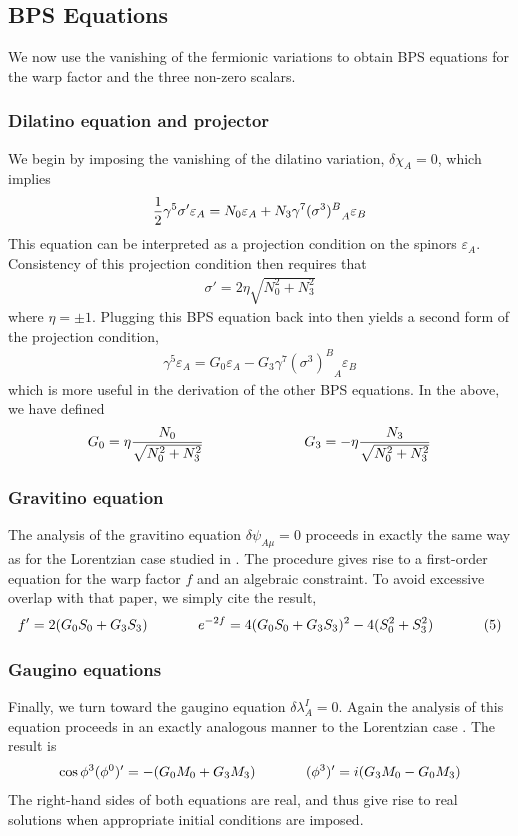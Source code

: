 \documentclass[12pt]{article}
\begin{document}
\subsection{BPS Equations}
We now use the vanishing of the fermionic variations to obtain BPS equations for the warp factor and the three non-zero scalars. 
\subsubsection{Dilatino equation and projector}
We begin by imposing the vanishing of the dilatino variation, $\delta\chi_A = 0$, which implies
\begin{eqnarray}
{1\over 2} \gamma^5 \sigma' \varepsilon_A = N_0 \varepsilon_A + N_3 \gamma^7 {(\sigma^3)^B}_A \varepsilon_B
\end{eqnarray}
This equation can be interpreted as a projection condition on the spinors $\varepsilon_A$. Consistency of this projection condition then requires that 
\begin{eqnarray}
 \sigma' = 2 \eta \sqrt{N_0^2 + N_3^2}
\end{eqnarray}
where $\eta = \pm1$. Plugging this BPS equation back into then yields a second form of the projection condition,
\begin{eqnarray}
\gamma^5 \varepsilon_A = G_0 \varepsilon_A - G_3 \gamma^7 {(\sigma^3)^B}_A \varepsilon_B
\end{eqnarray}
which is more useful in the derivation of the other BPS equations. In the above, we have defined 
\begin{eqnarray}
G_0 = \eta {N_0 \over \sqrt{N_0^2 + N_3^2}}\hspace{1 in} G_3 = -\eta {N_3 \over \sqrt{N_0^2 + N_3^2}}
\end{eqnarray}
\subsubsection{Gravitino equation}
The analysis of the gravitino equation  $\delta \psi_{A \mu}=0$ proceeds in exactly the same way as for the Lorentzian case studied in . The procedure gives rise to a first-order equation for the warp factor $f$ and an algebraic constraint. To avoid excessive overlap with that paper, we simply cite the result,
\begin{eqnarray}
f^{\prime }=2(G_{0}S_{0}+G_{3}S_{3})\hspace {.5in}e^{-2f}=4(G_{0}S_{0}+G_{3}S_{3})^{2}-4(S_{0}^{2}+S_{3}^{2})\hspace {.5in}(5)
\end{eqnarray}
\subsubsection{Gaugino equations}
Finally, we turn toward the gaugino equation $\delta \lambda^I_A=0$. Again the analysis of this equation proceeds in an exactly analogous manner to the Lorentzian case . The result is
\begin{eqnarray}
\cos \phi^3 (\phi^0)' = - (G_0 M_0 + G_3 M_3) \hspace{0.5 in} (\phi^3)' = i (G_3 M_0 - G_0 M_3)
\end{eqnarray}
The right-hand sides of both equations are real, and thus give rise to real solutions when appropriate initial conditions are imposed.
\end{document}
